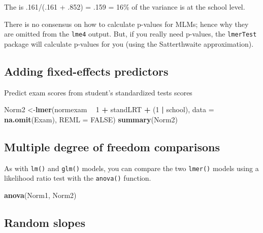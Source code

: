 \documentclass[
]{book}
\newenvironment{Shaded}{\begin{snugshade}}{\end{snugshade}}
\newcommand{\DataTypeTok}[1]{\textcolor[rgb]{0.13,0.29,0.53}{#1}}
\newcommand{\DecValTok}[1]{\textcolor[rgb]{0.00,0.00,0.81}{#1}}
\newcommand{\KeywordTok}[1]{\textcolor[rgb]{0.13,0.29,0.53}{\textbf{#1}}}
\newcommand{\NormalTok}[1]{#1}
\newcommand{\OperatorTok}[1]{\textcolor[rgb]{0.81,0.36,0.00}{\textbf{#1}}}
\newcommand{\OtherTok}[1]{\textcolor[rgb]{0.56,0.35,0.01}{#1}}
\newcommand{\StringTok}[1]{\textcolor[rgb]{0.31,0.60,0.02}{#1}}
\begin{document}
The is .161/(.161 + .852) = .159 = 16\% of the variance is at the school level.

There is no consensus on how to calculate p-values for MLMs; hence why they are omitted from the \texttt{lme4} output.
But, if you really need p-values, the \texttt{lmerTest} package will calculate p-values for you (using the Satterthwaite
approximation).

\hypertarget{adding-fixed-effects-predictors}{%
\subsection{Adding fixed-effects predictors}\label{adding-fixed-effects-predictors}}

Predict exam scores from student's standardized tests scores

\begin{Shaded}
\begin{Highlighting}[]
\NormalTok{  Norm2 <-}\KeywordTok{lmer}\NormalTok{(normexam }\OperatorTok{~}\StringTok{ }\DecValTok{1} \OperatorTok{+}\StringTok{ }\NormalTok{standLRT }\OperatorTok{+}\StringTok{ }\NormalTok{(}\DecValTok{1} \OperatorTok{|}\StringTok{ }\NormalTok{school),}
               \DataTypeTok{data =} \KeywordTok{na.omit}\NormalTok{(Exam), }\DataTypeTok{REML =} \OtherTok{FALSE}\NormalTok{) }
  \KeywordTok{summary}\NormalTok{(Norm2) }
\end{Highlighting}
\end{Shaded}

\hypertarget{multiple-degree-of-freedom-comparisons}{%
\subsection{Multiple degree of freedom comparisons}\label{multiple-degree-of-freedom-comparisons}}

As with \texttt{lm()} and \texttt{glm()} models, you can compare the two \texttt{lmer()} models using a likelihood ratio test with the \texttt{anova()} function.

\begin{Shaded}
\begin{Highlighting}[]
  \KeywordTok{anova}\NormalTok{(Norm1, Norm2)}
\end{Highlighting}
\end{Shaded}

\hypertarget{random-slopes}{%
\subsection{Random slopes}\label{random-slopes}}
\end{document}
